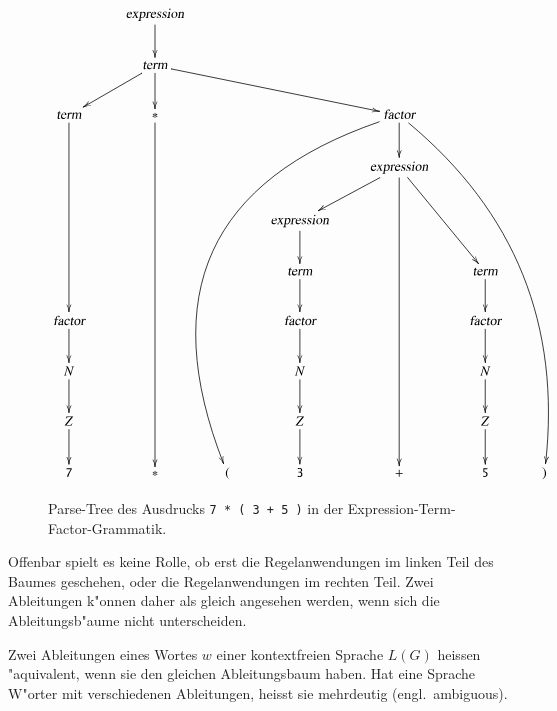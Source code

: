 \begin{figure}
{
\small
\[
\xymatrix{
	&\textsl{expression} \ar[d]
\\
	&\textsl{term} \ar[dl] \ar[d] \ar[drrr]
\\
\textsl{term}\ar[dddd]
	&{\tt *}\ar[ddddddd]
		&
			&
				&\textsl{factor}\ar@/_80pt/[dddddddll]\ar[d]\ar@/^40pt/[dddddddrr]
					&
						&
\\
	&
		&
			&
				&\textsl{expression}\ar[dl]\ar[dddddd]\ar[ddr]
					&
\\
	&
		&
			&\textsl{expression}\ar[d]
				&
					&
						&
\\
	&
		&
			&\textsl{term}\ar[d]
				&
					&\textsl{term}\ar[d]
						&
\\
\textsl{factor}\ar[d]
	&
		&
			&\textsl{factor}\ar[d]
				&
					&\textsl{factor}\ar[d]
						&
\\
N\ar[d]
	&
		&
			&N\ar[d]
				&
					&N\ar[d]
						&
\\
Z\ar[d]
	&
		&
			&Z\ar[d]
				&
					&Z\ar[d]
						&
\\
{\tt 7}
	&{\tt *}
		&{\tt (}
			&{\tt 3}
				&{\tt +}
					&{\tt 5}
						&{\tt )}
}
\]
}
\caption{Parse-Tree des Ausdrucks \texttt{7 * ( 3 + 5 )} in der
Expression-Term-Factor-Grammatik.
\label{etf-parse-tree}}
\end{figure}

Offenbar spielt es keine Rolle, ob erst die Regelanwendungen
im linken Teil des Baumes geschehen, oder die Regelanwendungen im
rechten Teil. Zwei Ableitungen k"onnen daher als gleich angesehen
werden, wenn sich die Ableitungsb"aume nicht unterscheiden.

\begin{definition}
Zwei Ableitungen eines Wortes $w$ einer kontextfreien Sprache $L(G)$
heissen "aquivalent, wenn sie den gleichen Ableitungsbaum haben.
Hat eine Sprache W"orter mit verschiedenen Ableitungen, heisst
sie mehrdeutig (engl.~ambiguous).
\end{definition}

